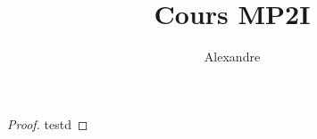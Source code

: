 \documentclass[12pt,a4paper]{article}
\title{Cours MP2I}
\author{Alexandre}
\date{}
\begin{document}
\setcounter{page}{0}
\maketitle

\begin{proof}
    testd
\end{proof}

\tableofcontents
\newpage


%
%

\end{document}
